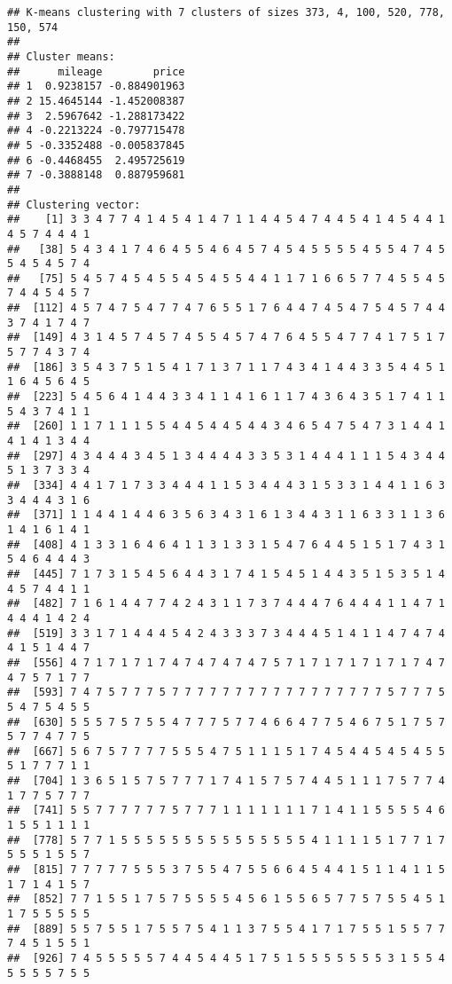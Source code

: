 \documentclass[
]{article}
\begin{document}
\begin{verbatim}
## K-means clustering with 7 clusters of sizes 373, 4, 100, 520, 778, 150, 574
## 
## Cluster means:
##      mileage        price
## 1  0.9238157 -0.884901963
## 2 15.4645144 -1.452008387
## 3  2.5967642 -1.288173422
## 4 -0.2213224 -0.797715478
## 5 -0.3352488 -0.005837845
## 6 -0.4468455  2.495725619
## 7 -0.3888148  0.887959681
## 
## Clustering vector:
##    [1] 3 3 4 7 7 4 1 4 5 4 1 4 7 1 1 4 4 5 4 7 4 4 5 4 1 4 5 4 4 1 4 5 7 4 4 4 1
##   [38] 5 4 3 4 1 7 4 6 4 5 5 4 6 4 5 7 4 5 4 5 5 5 5 4 5 5 4 7 4 5 5 4 5 4 5 7 4
##   [75] 5 4 5 7 4 5 4 5 5 4 5 4 5 5 4 4 1 1 7 1 6 6 5 7 7 4 5 5 4 5 7 4 4 5 4 5 7
##  [112] 4 5 7 4 7 5 4 7 7 4 7 6 5 5 1 7 6 4 4 7 4 5 4 7 5 4 5 7 4 4 3 7 4 1 7 4 7
##  [149] 4 3 1 4 5 7 4 5 7 4 5 5 4 5 7 4 7 6 4 5 5 4 7 7 4 1 7 5 1 7 5 7 7 4 3 7 4
##  [186] 3 5 4 3 7 5 1 5 4 1 7 1 3 7 1 1 7 4 3 4 1 4 4 3 3 5 4 4 5 1 1 6 4 5 6 4 5
##  [223] 5 4 5 6 4 1 4 4 3 3 4 1 1 4 1 6 1 1 7 4 3 6 4 3 5 1 7 4 1 1 5 4 3 7 4 1 1
##  [260] 1 1 7 1 1 1 5 5 4 4 5 4 4 5 4 4 3 4 6 5 4 7 5 4 7 3 1 4 4 1 4 1 4 1 3 4 4
##  [297] 4 3 4 4 4 3 4 5 1 3 4 4 4 4 3 3 5 3 1 4 4 4 1 1 1 5 4 3 4 4 5 1 3 7 3 3 4
##  [334] 4 4 1 7 1 7 3 3 4 4 4 1 1 5 3 4 4 4 3 1 5 3 3 1 4 4 1 1 6 3 3 4 4 4 3 1 6
##  [371] 1 1 4 4 1 4 4 6 3 5 6 3 4 3 1 6 1 3 4 4 3 1 1 6 3 3 1 1 3 6 1 4 1 6 1 4 1
##  [408] 4 1 3 3 1 6 4 6 4 1 1 3 1 3 3 1 5 4 7 6 4 4 5 1 5 1 7 4 3 1 5 4 6 4 4 4 3
##  [445] 7 1 7 3 1 5 4 5 6 4 4 3 1 7 4 1 5 4 5 1 4 4 3 5 1 5 3 5 1 4 4 5 7 4 4 1 1
##  [482] 7 1 6 1 4 4 7 7 4 2 4 3 1 1 7 3 7 4 4 4 7 6 4 4 4 1 1 4 7 1 4 4 4 1 4 2 4
##  [519] 3 3 1 7 1 4 4 4 5 4 2 4 3 3 3 7 3 4 4 4 5 1 4 1 1 4 7 4 7 4 4 1 5 1 4 4 7
##  [556] 4 7 1 7 1 7 1 7 4 7 4 7 4 7 4 7 5 7 1 7 1 7 1 7 1 7 1 7 4 7 4 7 5 7 1 7 7
##  [593] 7 4 7 5 7 7 7 5 7 7 7 7 7 7 7 7 7 7 7 7 7 7 7 7 7 5 7 7 7 5 5 4 7 5 4 5 5
##  [630] 5 5 5 7 5 7 5 5 4 7 7 7 5 7 7 4 6 6 4 7 7 5 4 6 7 5 1 7 5 7 5 7 7 4 7 7 5
##  [667] 5 6 7 5 7 7 7 7 5 5 5 4 7 5 1 1 1 5 1 7 4 5 4 4 5 4 5 4 5 5 5 1 7 7 7 1 1
##  [704] 1 3 6 5 1 5 7 5 7 7 7 1 7 4 1 5 7 5 7 4 4 5 1 1 1 7 5 7 7 4 1 7 7 5 7 7 7
##  [741] 5 5 7 7 7 7 7 7 5 7 7 7 1 1 1 1 1 1 1 7 1 4 1 1 5 5 5 5 4 6 1 5 5 1 1 1 1
##  [778] 5 7 7 1 5 5 5 5 5 5 5 5 5 5 5 5 5 5 5 4 1 1 1 1 5 1 7 7 1 7 5 5 5 1 5 5 7
##  [815] 7 7 7 7 7 5 5 5 3 7 5 5 4 7 5 5 6 6 4 5 4 4 1 5 1 1 4 1 1 5 1 7 1 4 1 5 7
##  [852] 7 7 1 5 5 1 7 5 7 5 5 5 5 4 5 6 1 5 5 6 5 7 7 5 7 5 5 4 5 1 1 7 5 5 5 5 5
##  [889] 5 5 7 5 5 1 7 5 5 7 5 4 1 1 3 7 5 5 4 1 7 1 7 5 5 1 5 5 7 7 7 4 5 1 5 5 1
##  [926] 7 4 5 5 5 5 5 7 4 4 5 4 4 5 1 7 5 1 5 5 5 5 5 5 5 3 1 5 5 4 5 5 5 5 7 5 5

\end{verbatim}
\end{document}
